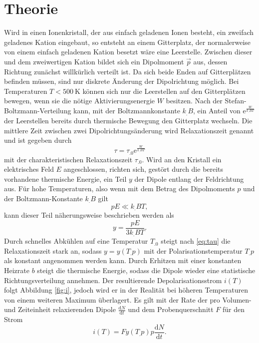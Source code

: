 \section{Theorie}
\label{sec:Theorie}

Wird in einen Ionenkristall, der aus einfach geladenen Ionen besteht, ein zweifach geladenes Kation eingebaut, so entsteht an einem Gitterplatz, der normalerweise von einem einfach geladenen Kation besetzt wäre eine Leerstelle.
Zwischen dieser und dem zweiwertigen Kation bildet sich ein Dipolmoment $\vec{p}$ aus, dessen Richtung zunächst willkürlich verteilt ist. Da sich beide Enden auf Gitterplätzen befinden müssen, sind nur diskrete Änderung der Dipolrichtung möglich. Bei Temperaturen $T<\SI{500}{\kelvin}$ können sich nur die Leerstellen auf den Gitterplätzen bewegen, wenn sie die nötige Aktivierungsenergie $W$ besitzen. Nach der Stefan-Boltzmann-Verteilung kann, mit der Boltzmannkonstante $k_.B$, ein Anteil von $\mathrm{e}^{\frac{W}{k_.BT}}$ der Leerstellen bereits durch thermische Bewegung den Gitterplatz wechseln.
Die mittlere Zeit zwischen zwei Dipolrichtungsänderung wird Relaxationszeit genannt und ist gegeben durch
\begin{equation}
\tau=\tau_.0\mathrm{e}^{\frac{W}{k_.BT}}\label{eq:tau}
\end{equation}
mit der charakteristischen Relaxationszeit $\tau_.0$.
Wird an den Kristall ein elektrisches Feld $E$ angeschlossen, richten sich, gestört durch die bereits vorhandene thermische Energie, ein Teil $y$ der Dipole entlang der Feldrichtung aus. Für hohe Temperaturen, also wenn mit dem Betrag des Dipolmoments $p$ und der Boltzmann-Konstante $k_.B$ gilt
\[
pE\ll k_.BT,
\]
kann dieser Teil näherungsweise beschrieben werden als
\begin{equation}
y=\frac{pE}{3k_.BT}\text{.}\label{eq:y}
\end{equation}
Durch schnelles Abkühlen auf eine Temperatur $T_.0$ steigt nach \eqref{eq:tau} die Relaxationszeit stark an, sodass $y=y(T_.p)$ mit der Polarisationstemperatur $T_.p$ als konstant angenommen werden kann.
Durch Erhitzen mit einer konstanten Heizrate $b$ steigt die thermische Energie, sodass die Dipole wieder eine statistische Richtungsverteilung annehmen. Der resultierende Depolarisationsstrom $i(T)$ folgt Abbildung \ref{fig:i}, jedoch wird er in der Realität bei höheren Temperaturen von einem weiteren Maximum überlagert.
Es gilt mit der Rate der pro Volumen- und Zeiteinheit relaxierenden Dipole $\frac{\mathrm{d}N}{\mathrm{d}t}$ und dem Probenquerschnitt $F$ für den Strom
\begin{equation}
i(T)=F y(T_.p)p\frac{\mathrm{d}N}{\mathrm{d}t}\text{.}\label{eq:i1}
\end{equation}
